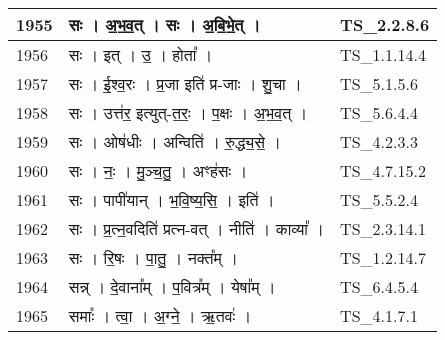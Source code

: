 \documentclass[17pt]{extarticle}
\begin{document}
\begin{longtable}{||p{0.4in}||p{4.9in}||p{0.9in}||}
    \hline
        
    1955 & सः   ।   अ॒भ॒व॒त्   ।   सः   ।   अ॒बि॒भे॒त्   ।    & TS\_2.2.8.6       \\
    
    \hline
        
    1956 & सः   ।   इत्   ।   उ॒   ।   होता᳚   ।    & TS\_1.1.14.4       \\
    
    \hline
        
    1957 & सः   ।   ई॒श्व॒रः   ।   प्र॒जा इति॑ प्र{-}जाः   ।   शु॒चा   ।    & TS\_5.1.5.6       \\
    
    \hline
        
    1958 & सः   ।   उत्त॑र॒ इत्युत्{-}त॒रः॒   ।   प॒क्षः   ।   अ॒भ॒व॒त्   ।    & TS\_5.6.4.4       \\
    
    \hline
        
    1959 & सः   ।   ओष॑धीः   ।   अन्विति॑   ।   रु॒द्ध्य॒से॒   ।    & TS\_4.2.3.3       \\
    
    \hline
        
    1960 & सः   ।   नः॒   ।   मु॒ञ्च॒तु॒   ।   अꣳह॑सः   ।    & TS\_4.7.15.2       \\
    
    \hline
        
    1961 & सः   ।   पापी॑यान्   ।   भ॒वि॒ष्य॒सि॒   ।   इति॑   ।    & TS\_5.5.2.4       \\
    
    \hline
        
    1962 & सः   ।   प्र॒त्न॒वदिति॑ प्रत्न{-}वत्   ।   नीति॑   ।   काव्या᳚   ।    & TS\_2.3.14.1       \\
    
    \hline
        
    1963 & सः   ।   रि॒षः   ।   पा॒तु॒   ।   नक्त᳚म्   ।    & TS\_1.2.14.7       \\
    
    \hline
        
    1964 & सन्न्   ।   दे॒वाना᳚म्   ।   प॒वित्र᳚म्   ।   येषा᳚म्   ।    & TS\_6.4.5.4       \\
    
    \hline
        
    1965 & समाः᳚   ।   त्वा॒   ।   अ॒ग्ने॒   ।   ऋ॒तवः॑   ।    & TS\_4.1.7.1       \\
    
    \hline
        

\end{longtable}
\end{document}
